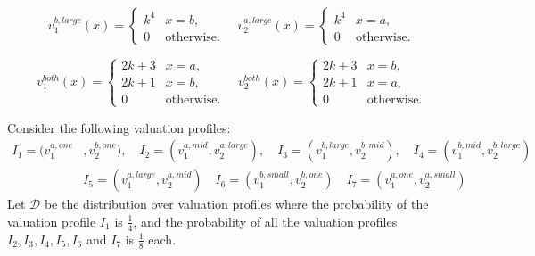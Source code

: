 \[
v_1^{{b,large}}(x) = 
\begin{cases}
k^4 & x=b,\\
0 & \text{otherwise.}
\end{cases} \quad 
v_2^{{a,large}}(x) = 
\begin{cases}
k^4 & x=a,\\
0 & \text{otherwise.}
\end{cases}
\]

\[
v_1^{{both}}(x) = 
\begin{cases}
2k+3 & x=a,\\
2k+1 & x=b,\\
0 & \text{otherwise.}
\end{cases} \quad 
v_2^{{both}}(x) = 
\begin{cases}
2k+3 & x=b,\\
2k+1 & x=a,\\
0 & \text{otherwise.}
\end{cases}
\]


Consider the following valuation profiles: 
\begin{align*}
 I_1 = (v_1^{{a,one}}&, v_2^{{b,one}}),\quad  I_2 = (v_1^{a,mid}, v_2^{{a,large}}),  \quad I_3 = (v_1^{b,large}, v_2^{b,mid}), \quad 
 I_4 = (v_1^{b,mid}, v_2^{b,large}) \\ &I_5 = (v_1^{a,large}, v_2^{a,mid}) \quad I_6 = (v_1^{b,small}, v_2^{b,one}) \quad I_7 =(v_1^{a,one}, v_2^{a,small}) 
\end{align*}
Let $\mathcal D$ be the distribution over valuation profiles where the probability of the valuation profile $I_1$ is $\frac{1}{4}$, and the probability of all the valuation profiles $I_2,I_3,I_4,I_5,I_6$ and $I_7$ is $\frac{1}{8}$ each. 

